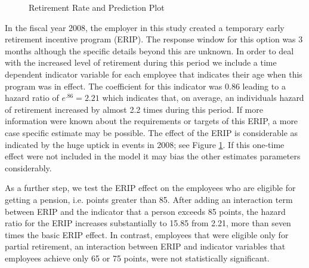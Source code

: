 \documentclass[12pt,letterpaper]{article}
\begin{document}
\begin{figure}[h!]
	\centering
	\caption{Retirement Rate and Prediction Plot}
	\label{fig:rerate}
\end{figure}

In the fiscal year 2008, the employer in this study created a temporary early retirement incentive program (ERIP). The response window for this option was 3 months although the specific details beyond this are unknown. In order to deal with the increased level of retirement during this period we include a time dependent indicator variable for each employee that indicates their age when this program was in effect.  The coefficient for this indicator was 0.86 leading to a hazard ratio of $e^{.86} = 2.21$ which indicates that, on average, an individuals hazard of retirement increased by almost 2.2 times during this period.  If more information were known about the requirements or targets of this ERIP, a more case specific estimate may be possible.  The effect of the ERIP is considerable as indicated by the huge uptick in events in 2008; see Figure \ref{fig:rerate}. If this one-time effect were not included in the model it may bias the other estimates parameters considerably.
	
As a further step, we test the ERIP effect on the employees who are eligible for getting a pension, i.e. points greater than 85. After adding an interaction term between ERIP and the indicator that a person exceeds 85 points, the hazard ratio for the ERIP increases substantially to 15.85 from 2.21, more than seven times the basic ERIP effect. In contrast, employees that were eligible only for partial retirement, an interaction between ERIP and indicator variables that employees achieve only 65 or 75 points, were not statistically significant.
\end{document}
